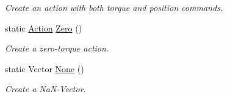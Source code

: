 \begin{DoxyCompactItemize}
\begin{DoxyCompactList}\small\item\em Create an action with both torque and position commands. \end{DoxyCompactList}\item 
static \hyperlink{structrobot__interfaces_1_1NJointRobotTypes_1_1Action}{Action} \hyperlink{structrobot__interfaces_1_1NJointRobotTypes_1_1Action_ad6fa1cd952afc4f02fcabc4221802b47}{Zero} ()
\begin{DoxyCompactList}\small\item\em Create a zero-\/torque action. \end{DoxyCompactList}\item 
static Vector \hyperlink{structrobot__interfaces_1_1NJointRobotTypes_1_1Action_ab963d5faa78618bdaae53dc70ca936ae}{None} ()
\begin{DoxyCompactList}\small\item\em Create a Na\+N-\/\+Vector. \end{DoxyCompactList}\end{DoxyCompactItemize}
